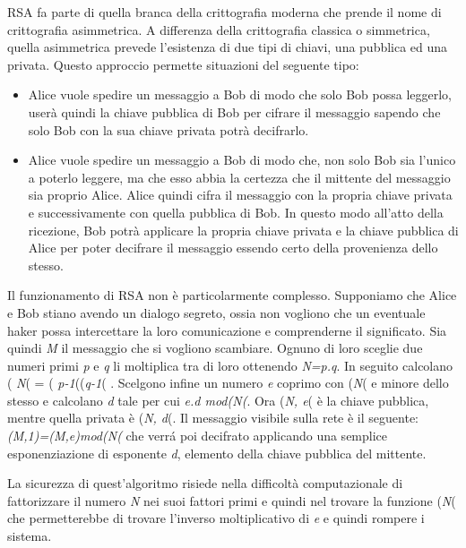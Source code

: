 RSA fa parte di quella branca della crittografia moderna che prende il nome di crittografia asimmetrica.
A differenza della crittografia classica o simmetrica, quella asimmetrica prevede l'esistenza di due tipi di chiavi, una pubblica ed una privata.
Questo approccio permette situazioni del seguente tipo:
\begin{itemize}


\item Alice vuole spedire un messaggio a Bob di modo che solo Bob possa leggerlo, userà quindi la chiave pubblica di Bob per cifrare il messaggio sapendo che solo Bob con la sua chiave privata potrà decifrarlo.

\item Alice vuole spedire un messaggio a Bob di modo che, non solo Bob sia l'unico a poterlo leggere, ma che esso abbia la certezza che il mittente del messaggio sia proprio Alice.
Alice quindi cifra il messaggio con la propria chiave privata e successivamente con quella pubblica di Bob. In questo modo all'atto della ricezione, Bob potrà applicare la propria chiave privata e la chiave pubblica di Alice per poter decifrare il messaggio essendo certo della provenienza dello stesso.

\end{itemize}

Il funzionamento di RSA non è particolarmente complesso.
Supponiamo che Alice e Bob stiano avendo un dialogo segreto, ossia non vogliono che un eventuale haker possa intercettare la loro comunicazione e comprenderne il significato.
Sia quindi \textit{M} il messaggio che si vogliono scambiare.
Ognuno di loro sceglie due numeri primi \textit{p} e \textit{q} li moltiplica tra di loro ottenendo \textit{N=p.q}.
In seguito calcolano \varphi\left( \textit{N}\right(  = \left( \textit{p-1}\right(\left(\textit{q-1}\right( .
Scelgono infine un numero \textit{e} coprimo con \varphi\left(\textit{N}\right( e minore dello stesso e calcolano \textit{d} tale per cui \textit{e.d mod\left(N\right(}.
Ora \left(\textit{N, e}\right( è la chiave pubblica, mentre quella privata è \left(\textit{N, d}\right(.
Il messaggio visibile sulla rete è il seguente: \textit{\esp(\textit{M},1)=\exp(M,e)mod\left(N\right(} che verr\'{a} poi decifrato applicando una semplice esponenziazione di esponente \textit{d}, elemento della chiave pubblica del mittente.

La sicurezza di quest'algoritmo risiede nella difficoltà computazionale di fattorizzare il numero \textit{N} nei suoi fattori primi e quindi nel trovare la funzione \varphi\left(\textit{N}\right(
che permetterebbe di trovare l'inverso moltiplicativo di \textit{e} e quindi rompere i sistema.

